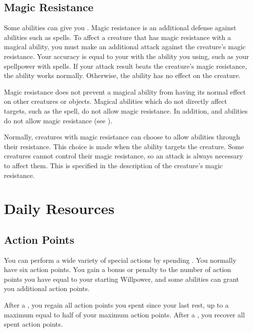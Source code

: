     \subsection{Magic Resistance}\label{Magic Resistance}
        Some abilities can give you .
        Magic resistance is an additional defense against  abilities such as spells.
        To affect a creature that has magic resistance with a magical ability, you must make an additional attack against the creature's magic resistance.
        Your accuracy is equal to your  with the ability you using, such as your spellpower with spells.
        If your attack result beats the creature's magic resistance, the ability works normally.
        Otherwise, the ability has no effect on the creature.

        Magic resistance does not prevent a magical ability from having its normal effect on other creatures or objects.
        Magical abilities which do not directly affect targets, such as the  spell, do not allow magic resistance.
        In addition,  and  abilities do not allow magic resistance (see ).

        Normally, creatures with magic resistance can choose to allow abilities through their resistance.
        This choice is made when the ability targets the creature.
        Some creatures cannot control their magic resistance, so an attack is always necessary to affect them.
        This is specified in the description of the creature's magic resistance.

\section{Daily Resources}

    \subsection{Action Points}\label{Action Points}
        You can perform a wide variety of special actions by spending .
        You normally have six action points.
        You gain a bonus or penalty to the number of action points you have equal to your starting Willpower, and some abilities can grant you additional action points.

        After a , you regain all action points you spent since your last rest, up to a maximum equal to half of your maximum action points.
        After a , you recover all spent action points.


